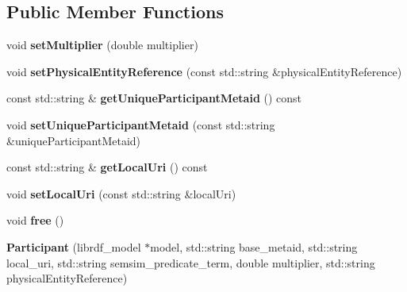 \subsection*{Public Member Functions}
\begin{DoxyCompactItemize}
\item 
\mbox{\label{classomexmeta_1_1Participant_aee7846dcbb910dd394a0683841ab723a}} 
void {\bfseries set\+Multiplier} (double multiplier)
\item 
\mbox{\label{classomexmeta_1_1Participant_a415c1205762dff6943426d830d74edcd}} 
void {\bfseries set\+Physical\+Entity\+Reference} (const std\+::string \&physical\+Entity\+Reference)
\item 
\mbox{\label{classomexmeta_1_1Participant_a3caabd03e7cf25d6591419e1ef7ee945}} 
const std\+::string \& {\bfseries get\+Unique\+Participant\+Metaid} () const
\item 
\mbox{\label{classomexmeta_1_1Participant_a5e8f680950f55230587c0f85498c5047}} 
void {\bfseries set\+Unique\+Participant\+Metaid} (const std\+::string \&unique\+Participant\+Metaid)
\item 
\mbox{\label{classomexmeta_1_1Participant_a6bf4c724ab5212d10f2a89893f369cd1}} 
const std\+::string \& {\bfseries get\+Local\+Uri} () const
\item 
\mbox{\label{classomexmeta_1_1Participant_a595323ae0681f42a7ba5981e2ee840f1}} 
void {\bfseries set\+Local\+Uri} (const std\+::string \&local\+Uri)
\item 
\mbox{\label{classomexmeta_1_1Participant_a395bc8d2561149a77371ed80e2ed1517}} 
void {\bfseries free} ()
\item 
\mbox{\label{classomexmeta_1_1Participant_ae93c371b174b799709381f1727605ba6}} 
{\bfseries Participant} (librdf\+\_\+model $\ast$model, std\+::string base\+\_\+metaid, std\+::string local\+\_\+uri, std\+::string semsim\+\_\+predicate\+\_\+term, double multiplier, std\+::string physical\+Entity\+Reference)
\item 

\end{DoxyCompactItemize}
